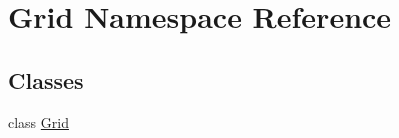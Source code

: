 \hypertarget{namespace_grid}{}\section{Grid Namespace Reference}
\label{namespace_grid}
\subsection*{Classes}
\begin{DoxyCompactItemize}
\item 
class \hyperlink{class_grid_1_1_grid}{Grid}
\end{DoxyCompactItemize}
